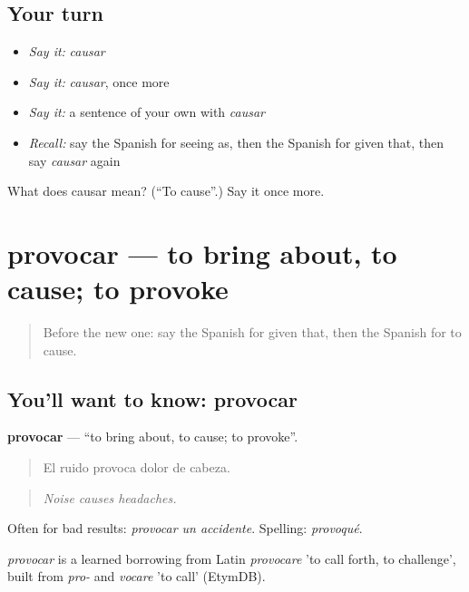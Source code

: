 \subsection*{Your turn}
\begin{itemize}
\raggedright
  \item \emph{Say it:} \emph{causar}
  \item \emph{Say it:} \emph{causar}, once more
  \item \emph{Say it:} a sentence of your own with \emph{causar}
  \item \emph{Recall:} say the Spanish for seeing as, then the Spanish for given that, then say \emph{causar} again
\end{itemize}

\begin{tcolorbox}[breakable,colback=teal!4,colframe=teal!35!black,title={Before you move on}]
What does causar mean? (\textquotedblleft{}To cause\textquotedblright{}.) Say it once more.
\end{tcolorbox}
\section[provocar]{provocar — to bring about, to cause; to provoke}

\label{lesson:ES-C581-provocar}



\begin{quote}
Before the new one: say the Spanish for given that, then the Spanish for to cause.
\end{quote}

\subsection*{You'll want to know: provocar}
\textbf{provocar} — \textquotedblleft{}to bring about, to cause; to provoke\textquotedblright{}.

\begin{quote}
El ruido provoca dolor de cabeza.
\end{quote}

\begin{quote}
\emph{Noise causes headaches.}
\end{quote}

Often for bad results: \emph{provocar un accidente}. Spelling: \emph{provoqué}.

\begin{cousinweb}
\emph{provocar} is a learned borrowing from Latin \emph{provocare} 'to call forth, to challenge', built from \emph{pro-} and \emph{vocare} 'to call' (EtymDB).
\end{cousinweb}

